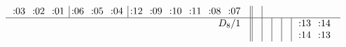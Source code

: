 \documentclass[11pt,a4paper]{amsart}
\begin{document}
\begin{align*}
\begin{array}{r||c|c|c|c|c}
\begin{array}{ccc|ccc|cccccc}
    \llap:03 & \llap:02 & \llap:01 & \llap:06 & \llap:05 & \llap:04 & \llap:12 & \llap:09 & \llap:10 & \llap:11 & \llap:08 & \llap:07 \\
  \end{array}
&\\ \hline
    \begin{array}{r}
      D_8/1 \\ \\
    \end{array}
    &
&&&&
          \begin{array}{cc}
            \llap:13 & \llap:14 \\
            \llap:14 & \llap:13 \\
          \end{array}
\\
  \end{array}
\end{align*}

\newpage

\footnotesize{}
\end{document}
